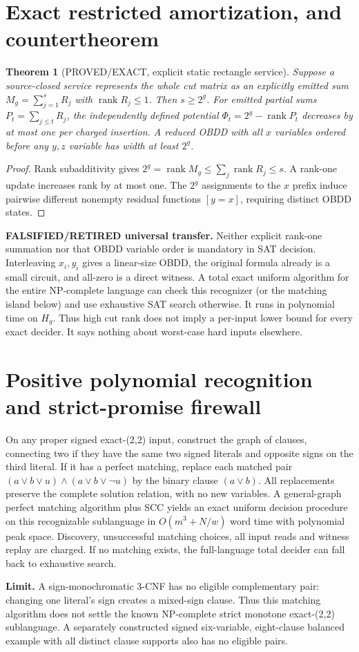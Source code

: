 \documentclass[11pt]{article}
\newtheorem{theorem}{Theorem}
\begin{document}
\section{Exact restricted amortization, and countertheorem}
\begin{theorem}[PROVED/EXACT, explicit static rectangle service]
Suppose a source-closed service represents the whole cut matrix as an explicitly emitted sum $M_g=\sum_{j=1}^{s}R_j$ with $\operatorname{rank}R_j\le1$. Then $s\ge2^g$. For emitted partial sums $P_t=\sum_{j\le t}R_j$, the independently defined potential $\Phi_t=2^g-\operatorname{rank}P_t$ decreases by at most one per charged insertion. A reduced OBDD with all $x$ variables ordered before any $y,z$ variable has width at least $2^g$.
\end{theorem}
\begin{proof}
Rank subadditivity gives $2^g=\operatorname{rank}M_g\le\sum_j\operatorname{rank}R_j\le s$. A rank-one update increases rank by at most one. The $2^g$ assignments to the $x$ prefix induce pairwise different nonempty residual functions $[y=x]$, requiring distinct OBDD states.
\end{proof}
\noindent\textbf{FALSIFIED/RETIRED universal transfer.} Neither explicit rank-one summation nor that OBDD variable order is mandatory in SAT decision. Interleaving $x_i,y_i$ gives a linear-size OBDD, the original formula already is a small circuit, and all-zero is a direct witness. A total exact uniform algorithm for the entire NP-complete language can check this recognizer (or the matching island below) and use exhaustive SAT search otherwise. It runs in polynomial time on $H_g$. Thus high cut rank does not imply a per-input lower bound for every exact decider. It says nothing about worst-case hard inputs elsewhere.
\section{Positive polynomial recognition and strict-promise firewall}
On any proper signed exact-(2,2) input, construct the graph of clauses, connecting two if they have the same two signed literals and opposite signs on the third literal. If it has a perfect matching, replace each matched pair
$(a\vee b\vee u)\land(a\vee b\vee\neg u)$ by the binary clause $(a\vee b)$. All replacements preserve the complete solution relation, with no new variables. A general-graph perfect matching algorithm plus SCC yields an exact uniform decision procedure on this recognizable sublanguage in $O(m^3+N/w)$ word time with polynomial peak space. Discovery, unsuccessful matching choices, all input reads and witness replay are charged. If no matching exists, the full-language total decider can fall back to exhaustive search.
\par\noindent\textbf{Limit.} A sign-monochromatic 3-CNF has no eligible complementary pair: changing one literal's sign creates a mixed-sign clause. Thus this matching algorithm does not settle the known NP-complete strict monotone exact-(2,2) sublanguage. A separately constructed signed six-variable, eight-clause balanced example with all distinct clause supports also has no eligible pairs.
\end{document}
